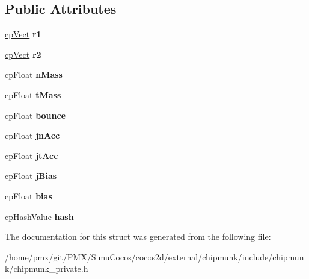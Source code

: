 \subsection*{Public Attributes}
\begin{DoxyCompactItemize}
\item 
\mbox{\label{structcpContact_a30ea3ddb5c7b028cd1ce5d2ee92ac301}} 
\hyperlink{structcpVect}{cp\+Vect} {\bfseries r1}
\item 
\mbox{\label{structcpContact_a07adb5206473f2fc05b4344abde787cd}} 
\hyperlink{structcpVect}{cp\+Vect} {\bfseries r2}
\item 
\mbox{\label{structcpContact_ac5d0505328b0068f47eee7927268f69e}} 
cp\+Float {\bfseries n\+Mass}
\item 
\mbox{\label{structcpContact_a0ad3ef72cf8b1063953c8539a24a0559}} 
cp\+Float {\bfseries t\+Mass}
\item 
\mbox{\label{structcpContact_a2d3afaf4917fc1f240b145ba4792a65d}} 
cp\+Float {\bfseries bounce}
\item 
\mbox{\label{structcpContact_ab6e608723226293fed10834a1e79215c}} 
cp\+Float {\bfseries jn\+Acc}
\item 
\mbox{\label{structcpContact_a45337f7a21dc55faf402f87465d7bd5c}} 
cp\+Float {\bfseries jt\+Acc}
\item 
\mbox{\label{structcpContact_a0a626c4ba591d693e88eceb737b22d80}} 
cp\+Float {\bfseries j\+Bias}
\item 
\mbox{\label{structcpContact_ae7f4f699739f54df581effb936ffe766}} 
cp\+Float {\bfseries bias}
\item 
\mbox{\label{structcpContact_a1ecf53c870da47cdedfb9340b774ee08}} 
\hyperlink{group__basicTypes_gae7eb4775a9f43914a15553ca65a048f4}{cp\+Hash\+Value} {\bfseries hash}
\end{DoxyCompactItemize}


The documentation for this struct was generated from the following file\+:\begin{DoxyCompactItemize}
\item 
/home/pmx/git/\+P\+M\+X/\+Simu\+Cocos/cocos2d/external/chipmunk/include/chipmunk/chipmunk\+\_\+private.\+h\end{DoxyCompactItemize}
